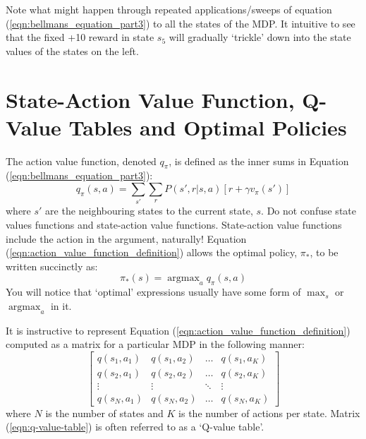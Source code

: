 \documentclass[a4paper,11pt]{article}
\DeclareMathOperator*{\argmax}{argmax}
\begin{document}
Note what might happen through repeated applications/sweeps of equation (\ref{eqn:bellmans_equation_part3}) to all the states of the MDP.  It intuitive to see that the fixed +10 reward in state $s_5$ will gradually `trickle' down into the state values of the states on the left.  



\section{State-Action Value Function, Q-Value Tables and Optimal Policies}

The action value function, denoted $q_{\pi}$, is defined as the inner sums in Equation (\ref{eqn:bellmans_equation_part3}):
\begin{equation} \label{eqn:action_value_function_definition}
    q_{\pi}(s,a) = \sum_{s'} \sum_r P(s',r|s,a) [r + \gamma v_{\pi}(s')]
\end{equation}
where $s'$ are the neighbouring states to the current state, $s$.  Do not confuse state values functions and state-action value functions.  State-action value functions include the action in the argument, naturally!  Equation (\ref{eqn:action_value_function_definition}) allows the optimal policy, $\pi_{*}$, to be written succinctly as:
\begin{equation} \label{eqn:optimal_policy_wrt_action_values}
    \pi_{*}(s) = \argmax_a q_{\pi}(s,a)
\end{equation}
You will notice that `optimal' expressions usually have some form of $\max_s$ or $\argmax_a$ in it.

It is instructive to represent Equation (\ref{eqn:action_value_function_definition}) computed as a matrix for a particular MDP in the following manner:
\begin{equation} \label{eqn:q-value-table}
\begin{bmatrix}
    q(s_1,a_1) & q(s_1,a_2) & \hdots & q(s_1,a_K) \\
    q(s_2,a_1) & q(s_2,a_2) & \hdots & q(s_2,a_K) \\
    \vdots & \vdots & \ddots & \vdots \\
    q(s_N,a_1) & q(s_N,a_2) & \hdots & q(s_N,a_K)
\end{bmatrix}
\end{equation}
where $N$ is the number of states and $K$ is the number of actions per state.  Matrix (\ref{eqn:q-value-table}) is often referred to as a `Q-value table'.  
\end{document}
